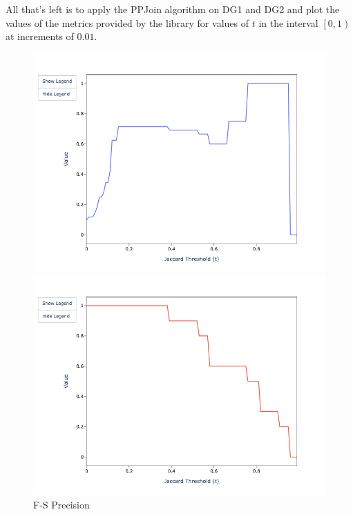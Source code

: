 \documentclass[a4paper,twoside]{article}
\begin{document}
    All that's left is to apply the PPJoin algorithm on DG1 and DG2 and plot the
    values of the metrics provided by the library for values of $t$ in the
    interval $\left[0, 1\right)$ at increments of $0.01$.

    \begin{figure}
        \begin{minipage}{0.32\textwidth}
            \centering
            \includegraphics[width=\textwidth]{sample-usage/mini-fs-precision}
            \caption{F-S Precision}
        \end{minipage}    
        \begin{minipage}{0.32\textwidth}
            \centering
            \includegraphics[width=\textwidth]{sample-usage/mini-fs-recall}

\end{minipage}
\end{figure}
\end{document}
